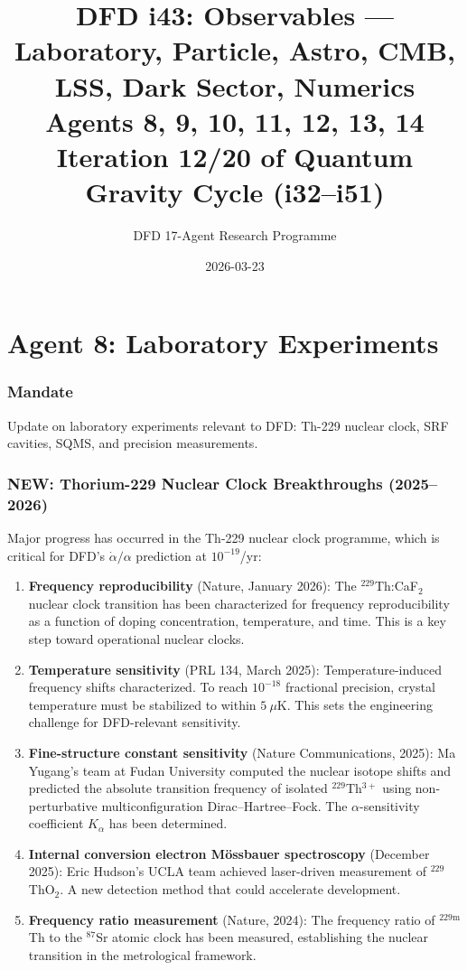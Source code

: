 \documentclass[11pt,a4paper]{article}
\title{DFD i43: Observables --- Laboratory, Particle, Astro, CMB, LSS, Dark Sector, Numerics\\[6pt]
\large Agents 8, 9, 10, 11, 12, 13, 14\\[6pt]
\normalsize Iteration 12/20 of Quantum Gravity Cycle (i32--i51)}
\author{DFD 17-Agent Research Programme}
\date{2026-03-23}
\newcommand{\NEW}{\textcolor{dfdblue}{\textbf{NEW}}}
\begin{document}
\maketitle
\tableofcontents
\newpage

\part{Agent 8: Laboratory Experiments}
\label{part:agent8}

\section{Mandate}

Update on laboratory experiments relevant to DFD: Th-229 nuclear clock, SRF cavities, SQMS, and precision measurements.

\section{\NEW: Thorium-229 Nuclear Clock Breakthroughs (2025--2026)}

Major progress has occurred in the Th-229 nuclear clock programme, which is critical for DFD's $\dot{\alpha}/\alpha$ prediction at $10^{-19}$/yr:

\begin{enumerate}
\item \textbf{Frequency reproducibility} (Nature, January 2026): The $^{229}$Th:CaF$_2$ nuclear clock transition has been characterized for frequency reproducibility as a function of doping concentration, temperature, and time. This is a key step toward operational nuclear clocks.

\item \textbf{Temperature sensitivity} (PRL 134, March 2025): Temperature-induced frequency shifts characterized. To reach $10^{-18}$ fractional precision, crystal temperature must be stabilized to within $5~\mu$K. This sets the engineering challenge for DFD-relevant sensitivity.

\item \textbf{Fine-structure constant sensitivity} (Nature Communications, 2025): Ma Yugang's team at Fudan University computed the nuclear isotope shifts and predicted the absolute transition frequency of isolated $^{229}$Th$^{3+}$ using non-perturbative multiconfiguration Dirac--Hartree--Fock. The $\alpha$-sensitivity coefficient $K_\alpha$ has been determined.

\item \textbf{Internal conversion electron M\"ossbauer spectroscopy} (December 2025): Eric Hudson's UCLA team achieved laser-driven measurement of $^{229}$ThO$_2$. A new detection method that could accelerate development.

\item \textbf{Frequency ratio measurement} (Nature, 2024): The frequency ratio of $^{229\text{m}}$Th to the $^{87}$Sr atomic clock has been measured, establishing the nuclear transition in the metrological framework.
\end{enumerate}
\end{document}
